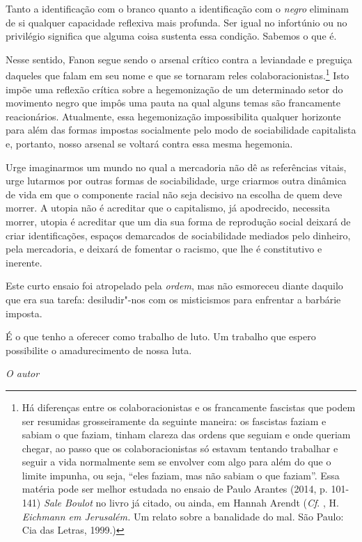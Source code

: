 Tanto a identificação com o branco quanto a identificação com o
\emph{negro} eliminam de si qualquer capacidade reflexiva mais profunda.
Ser igual no infortúnio ou no privilégio significa que alguma coisa
sustenta essa condição. Sabemos o que é.

Nesse sentido, Fanon segue sendo o arsenal crítico contra a leviandade e
preguiça daqueles que falam em seu nome e que se tornaram reles
colaboracionistas.\footnote{Há diferenças entre os colaboracionistas e os
  francamente fascistas que podem ser resumidas grosseiramente da
  seguinte maneira: os fascistas faziam e sabiam o que faziam, tinham
  clareza das ordens que seguiam e onde queriam chegar, ao passo que os
  colaboracionistas só estavam tentando trabalhar e seguir a vida
  normalmente sem se envolver com algo para além do que o limite
  impunha, ou seja, ``eles faziam, mas não sabiam o que faziam''. Essa
  matéria pode ser melhor estudada no ensaio de Paulo Arantes (2014, p.
  101-141) \emph{Sale Boulot} no livro já citado, ou ainda, em Hannah
  Arendt (\emph{Cf}. , H. \emph{Eichmann em Jerusalém.} Um relato sobre a
  banalidade do mal. São Paulo: Cia das Letras, 1999.)} Isto impõe uma
reflexão crítica sobre a hegemonização de um determinado setor do
movimento negro que impôs uma pauta na qual alguns temas são francamente
reacionários. Atualmente, essa hegemonização impossibilita qualquer
horizonte para além das formas impostas socialmente pelo modo de
sociabilidade capitalista e, portanto, nosso arsenal se voltará contra
essa mesma hegemonia.

Urge imaginarmos um mundo no qual a mercadoria não dê as referências
vitais, urge lutarmos por outras formas de sociabilidade, urge criarmos
outra dinâmica de vida em que o componente racial não seja decisivo na
escolha de quem deve morrer. A utopia não é acreditar que o capitalismo,
já apodrecido, necessita morrer, utopia é acreditar que um dia sua forma
de reprodução social deixará de criar identificações, espaços demarcados
de sociabilidade mediados pelo dinheiro, pela mercadoria, e deixará de
fomentar o racismo, que lhe é
constitutivo e inerente.

\pagebreak

Este curto ensaio foi atropelado pela \emph{ordem}, mas não esmoreceu
diante daquilo que era sua tarefa: desiludir"-nos com os misticismos para
enfrentar a barbárie imposta.

É o que tenho a oferecer como trabalho de luto. 
Um trabalho que espero possibilite o amadurecimento de nossa luta.
\begin{flushright} 
\emph{O autor}
\end{flushright}

